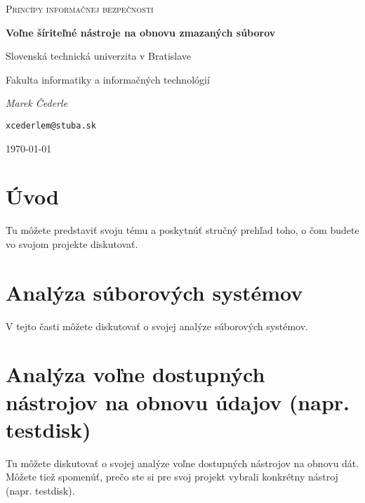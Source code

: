 \documentclass[12pt,oneside,slovak,a4paper]{article}
\begin{document}

\begin{titlepage}
	\centering
	{\LARGE \textsc{}\par}
	\vspace{5cm}
	{\Large \textsc{Princípy informačnej bezpečnosti}\par}
	\vspace{1.5cm}
	{\huge\bfseries Voľne šíriteľné nástroje na obnovu zmazaných súborov\par}
    \vspace{1cm}
    {\large Slovenská technická univerzita v Bratislave\par}
    {\large Fakulta informatiky a informačných technológií\par}
	\vspace{1cm}
	{\Large\itshape Marek Čederle\par}
    {\small\texttt{xcederlem@stuba.sk}\par}
	\vfill

	{\large \today\par}
\end{titlepage}


\tableofcontents
\vspace*{\fill}

\section{Úvod}
Tu môžete predstaviť\cite{TEST} svoju tému a poskytnúť stručný prehľad toho, o čom budete vo svojom projekte diskutovať.

\section{Analýza súborových systémov}
V tejto časti môžete diskutovať o svojej analýze súborových systémov.

\section{Analýza voľne dostupných nástrojov na obnovu údajov (napr. testdisk)}
Tu môžete diskutovať o svojej analýze voľne dostupných nástrojov na obnovu dát. Môžete tiež spomenúť, prečo ste si pre svoj projekt vybrali konkrétny nástroj (napr. testdisk).
\end{document}

